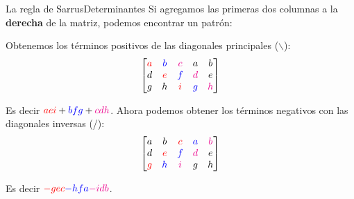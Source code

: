 \documentclass[spanish, c]{beamer}
\begin{document}
\begin{frame}{La regla de Sarrus}{Determinantes}
    Si agregamos las \alert{primeras dos columnas} a la \textbf{derecha} de la matriz, podemos encontrar un patrón: \pause

    Obtenemos los términos positivos de las \alert{diagonales principales} ($\backslash$):
    $$\begin{bmatrix}
        \color{red} a & \color{blue} b & \color{magenta} c & a & b \\
        d & \color{red} e & \color{blue} f & \color{magenta} d & e \\
        g & h & \color{red} i & \color{blue} g & \color{magenta} h
    \end{bmatrix}$$

    Es decir ${\color{red} aei} + {\color{blue} bfg} + {\color{magenta} cdh}$. Ahora podemos obtener los términos negativos con las \alert{diagonales inversas} (/):
    $$\begin{bmatrix}
        a & b & \color{red} c & \color{blue} a & \color{magenta} b \\
        d & \color{red} e & \color{blue} f & \color{magenta} d & e \\
        \color{red} g & \color{blue} h & \color{magenta} i & g & h
    \end{bmatrix}$$
    
    Es decir ${\color{red} -gec} {\color{blue} -hfa} {\color{magenta} -idb}$.
\end{frame}





\end{document}
